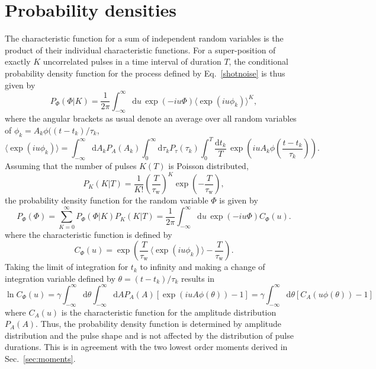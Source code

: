 \documentclass[aps,prb,12pt,a4paper,preprint,amsmath,amssymb,groupedaddress]{revtex4-1}
\newcommand{\rmd}{\text{d}}
\newcommand{\tauw}{\ensuremath{\tau_\text{w}}}
\newcommand{\Eqref}[1]{Eq.~\eqref{#1}}
\newcommand{\Secref}[1]{Sec.~\ref{#1}}
\begin{document}
\appendix



\section{Probability densities}\label{sec:pdf}



The characteristic function for a sum of independent random variables is the product of their individual characteristic functions. For a super-position of exactly $K$ uncorrelated pulses in a time interval of duration $T$, the conditional probability density function for the process defined by \Eqref{shotnoise} is thus given by
\begin{equation}%
P_\Phi(\Phi | K) = \frac{1}{2\pi}\int_{-\infty}^{\infty} \rmd u\,\exp(-iu\Phi) \langle{\exp(iu\phi_k)}\rangle^K ,
\end{equation}
where the angular brackets as usual denote an average over all random variables of $\phi_k=A_k\phi((t-t_k)/\tau_k$,
\begin{equation}
\langle{\exp(iu\phi_k)}\rangle = \int_{-\infty}^{\infty} \rmd A_k P_A(A_k) \int_{0}^{\infty} \rmd\tau_k P_\tau(\tau_k) \int_0^T \frac{\rmd t_k}{T}\, \exp\left( iu A_k\phi\left( \frac{t-t_k}{\tau_k} \right) \right) .
\end{equation}
Assuming that the number of pulses $K(T)$ is Poisson distributed,
\begin{equation} \label{poisson}
P_K(K|T) = \frac{1}{K!}\left(\frac{T}{\tauw}\right)^K\exp\left(-\frac{T}{\tauw} \right) ,
\end{equation}
the probability density function for the random variable $\Phi$ is given by
\begin{equation}
P_\Phi(\Phi) = \sum_{K=0}^{\infty} P_\Phi(\Phi|K) P_K(K|T) = \frac{1}{2\pi}\int_{-\infty}^{\infty} \rmd u\,\exp( - iu\Phi )C_\Phi(u) .
\end{equation}
where the characteristic function is defined by
\begin{equation}
{C_\Phi(u)} = \exp\left( \frac{T}{\tauw}\,\langle\exp(iu\phi_k)\rangle - \frac{T}{\tauw} \right) . 
\end{equation}
Taking the limit of integration for $t_k$ to infinity and making a change of integration variable defined by $\theta=(t-t_k)/\tau_k$ results in
\begin{equation}
\ln{C_\Phi(u)} = \gamma \int_{-\infty}^{\infty} \rmd\theta \int_{-\infty}^{\infty} \rmd A P_A(A) \left[ \exp\left( iuA\phi(\theta) \right) - 1 \right] = \gamma \int_{-\infty}^{\infty} \rmd\theta \left[ C_A(u\phi(\theta)) - 1 \right]
\end{equation}
where $C_A(u)$ is the characteristic function for the amplitude distribution $P_A(A)$. Thus, the probability density function is determined by amplitude distribution and the pulse shape and is not affected by the distribution of pulse durations. This is in agreement with the two lowest order moments derived in \Secref{sec:moments}.
\end{document}
